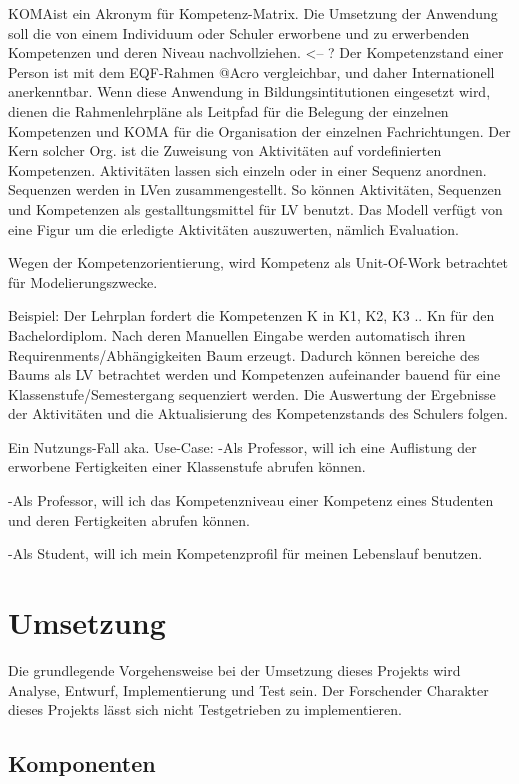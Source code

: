 \documentclass[
12pt,
english,
ngerman,
headsepline,
twoside,
openright,
numbers=noenddot,version=first
]{scrreprt}
\begin{document}
\glqq KOMA\grqq ist ein Akronym für Kompetenz-Matrix. Die Umsetzung der Anwendung soll die von einem Individuum oder Schuler
erworbene und zu erwerbenden Kompetenzen und deren Niveau nachvollziehen. <-- ?
Der Kompetenzstand einer Person ist mit dem EQF-Rahmen @Acro vergleichbar, und daher Internationell anerkenntbar.
Wenn diese Anwendung in Bildungsintitutionen eingesetzt wird, dienen die Rahmenlehrpläne als Leitpfad für die Belegung der einzelnen Kompetenzen
und KOMA für die Organisation der einzelnen Fachrichtungen. Der Kern solcher Org. ist die Zuweisung von Aktivitäten auf vordefinierten Kompetenzen.
Aktivitäten lassen sich einzeln oder in einer Sequenz anordnen. Sequenzen werden in LVen zusammengestellt. So können Aktivitäten, Sequenzen und Kompetenzen
als gestalltungsmittel für LV benutzt. Das Modell verfügt von eine Figur um die erledigte Aktivitäten auszuwerten, nämlich Evaluation.

Wegen der Kompetenzorientierung, wird Kompetenz als Unit-Of-Work betrachtet für Modelierungszwecke.

Beispiel:
Der Lehrplan fordert die Kompetenzen K in K1, K2, K3 .. Kn für den Bachelordiplom. Nach deren Manuellen Eingabe werden automatisch
ihren Requirenments/Abhängigkeiten Baum erzeugt. Dadurch können bereiche des Baums als LV betrachtet werden und Kompetenzen aufeinander
bauend für eine Klassenstufe/Semestergang sequenziert werden. Die Auswertung der Ergebnisse der Aktivitäten und die Aktualisierung des Kompetenzstands
des Schulers folgen.

Ein Nutzungs-Fall aka. Use-Case: 
-Als Professor, will ich eine Auflistung der erworbene Fertigkeiten einer Klassenstufe abrufen können.

-Als Professor, will ich das Kompetenzniveau einer Kompetenz eines Studenten und deren Fertigkeiten abrufen können.

-Als Student, will ich mein Kompetenzprofil für meinen Lebenslauf benutzen.

\chapter{Umsetzung}
Die grundlegende Vorgehensweise bei der Umsetzung dieses Projekts wird Analyse, Entwurf, Implementierung und Test sein. Der Forschender Charakter dieses Projekts lässt sich nicht Testgetrieben zu implementieren. 

\section{Komponenten}
\end{document}
